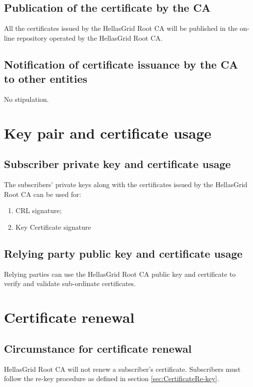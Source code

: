 \documentclass[11pt,a4paper,titlepage]{book}
\begin{document}
\subsection{Publication of the certificate by the CA}

All the certificates issued by the HellasGrid Root CA will be published in the on-line repository operated by the HellasGrid Root CA.

\subsection{Notification of certificate issuance by the CA to other entities}

No stipulation.

\section{Key pair and certificate usage}
\subsection{Subscriber private key and certificate usage}

The subscribers' private keys along with the certificates issued by the HellasGrid Root CA can be used for:

\begin{enumerate}
\item{CRL signature;}
\item{Key Certificate signature}
\end{enumerate}

\subsection{Relying party public key and certificate usage}

Relying parties can use the HellasGrid Root CA public key and certificate to verify and validate sub-ordinate certificates.


\section{Certificate renewal}
\subsection{Circumstance for certificate renewal}

HellasGrid Root CA will not renew a subscriber’s certificate. Subscribers must follow the re-key procedure as defined in section \ref{sec:CertificateRe-key}.
\end{document}
